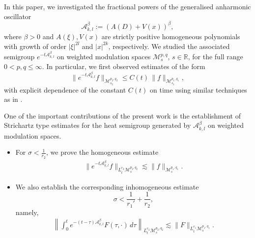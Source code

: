 \documentclass[12pt,reqno,a4paper]{amsart}
\numberwithin{equation}{section}
\theoremstyle{plain}
\theoremstyle{definition}
\theoremstyle{remark}
\begin{document}
In this paper, we investigated the fractional powers of the generalised anharmonic oscillator
\[
\mathcal{A}^{\beta}_{k,l}:= \left(A(D) + V(x)\right)^{\beta},
\]
where $\beta>0$ and $A(\xi), V(x)$ are strictly positive homogeneous polynomials with growth of order $|\xi|^{2l}$ and $|x|^{2k}$, respectively. We studied the associated semigroup $e^{-t\mathcal{A}_{k,l}^{\beta}}$ on weighted modulation spaces $\mathcal{M}^{p,q}_{s}$, $s\in\mathbb{R}$, for the full range $0<p,q\leq\infty$. In particular, we first observed estimates of the form
\[
\bigl\| e^{-t\mathcal{A}_{k,l}^{\beta}} f \bigr\|_{\mathcal{M}^{p_2,q_2}_{s_2}}
\le
C(t)\,
\|f\|_{\mathcal{M}^{p_1,q_1}_{s_1}},
\]
with explicit dependence of the constant $C(t)$ on time using similar techniques as in \cite{dasgupta2026phase, MR4944933, MR4313961}.

One of the important contributions of the present work is the establishment of Strichartz type estimates for the heat semigroup generated by $\mathcal{A}_{k,l}^{\beta}$ on weighted modulation spaces.

\begin{itemize}
\item For $\sigma<\frac{1}{r_{2}}$, we prove the homogeneous estimate
\begin{align*}
\|e^{-t\mathcal{A}_{k,l}^{\beta}}f\|_{L^{r_{2}}_{t}\mathcal{M}^{p_{2},q_{2}}_{s}}
\lesssim
\|f\|_{\mathcal{M}^{p_{1},q_{1}}_{s}}.
\end{align*}

\item We also establish the corresponding inhomogeneous estimate
\[
\sigma<\frac{1}{r_{1}'}+\frac{1}{r_{2}},
\]
namely,
\begin{align*}
\left\|
\int_{0}^{t}
e^{-(t-\tau)\mathcal{A}_{k,l}^{\beta}}
F(\tau,\cdot)\,d\tau
\right\|_{L^{r_{2}}_{t}\mathcal{M}^{p_{2},q_{2}}_{s}}
\lesssim
\|F\|_{L^{r_{1}}_{t}\mathcal{M}^{p_{1},q_{1}}_{s}}.
\end{align*}
\end{itemize}
\end{document}
